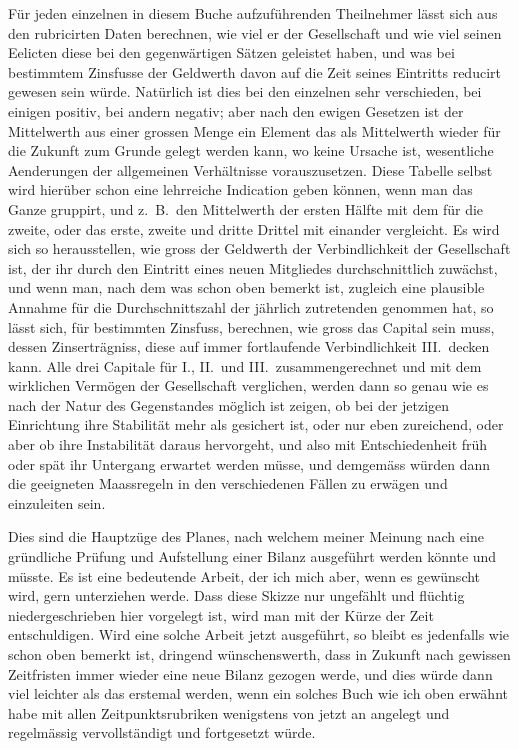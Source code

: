 \documentclass[12pt,a4paper]{article}
\begin{document}
F\"ur jeden einzelnen in diesem Buche aufzuf\"uhrenden Theilnehmer l\"asst sich aus den rubricirten Daten berechnen, wie viel er der Gesellschaft und wie viel seinen Eelicten diese bei den gegenw\"artigen S\"atzen geleistet haben, und was bei bestimmtem Zinsfusse der Geldwerth davon auf die Zeit seines Eintritts reducirt gewesen sein w\"urde. Nat\"urlich ist dies bei den einzelnen sehr verschieden, bei einigen positiv, bei andern negativ; aber nach den ewigen Gesetzen ist der Mittelwerth aus einer grossen Menge ein Element das als Mittelwerth wieder f\"ur die Zukunft zum Grunde gelegt werden kann, wo keine Ursache ist, wesentliche Aenderungen der allgemeinen Verh\"altnisse vorauszusetzen. Diese Tabelle selbst wird hier\"uber schon eine lehrreiche Indication geben k\"onnen, wenn man das Ganze gruppirt, und z.\ B.\ den Mittelwerth der ersten H\"alfte mit dem f\"ur die zweite, oder das erste, zweite und dritte Drittel mit einander vergleicht. Es wird sich so herausstellen, wie gross der Geldwerth der Verbindlichkeit der Gesellschaft ist, der ihr durch den Eintritt eines neuen Mitgliedes durchschnittlich zuw\"achst, und wenn man, nach dem was schon oben bemerkt ist, zugleich eine plausible Annahme f\"ur die Durchschnittszahl der j\"ahrlich zutretenden genommen hat, so l\"asst sich, f\"ur bestimmten Zinsfuss, berechnen, wie gross das Capital sein muss, dessen Zinsertr\"agniss, diese auf immer fortlaufende Verbindlichkeit III.\ decken kann. Alle drei Capitale f\"ur I., II.\ und III.\ zusammengerechnet und mit dem wirklichen Verm\"ogen der Gesellschaft verglichen, werden dann so genau wie es nach der Natur des Gegenstandes m\"oglich ist zeigen, ob bei der jetzigen Einrichtung ihre Stabilit\"at mehr als gesichert ist, oder nur eben zureichend, oder aber ob ihre Instabilit\"at daraus hervorgeht, und also mit Entschiedenheit fr\"uh oder sp\"at ihr Untergang erwartet werden m\"usse, und demgem\"ass w\"urden dann die geeigneten Maassregeln in den verschiedenen F\"allen zu erw\"agen und einzuleiten sein.

Dies sind die Hauptz\"uge des Planes, nach welchem meiner Meinung nach eine gr\"undliche Pr\"ufung und Aufstellung einer Bilanz ausgef\"uhrt werden k\"onnte und m\"usste. Es ist eine bedeutende Arbeit, der ich mich aber, wenn es gew\"unscht wird, gern unterziehen werde. Dass diese Skizze nur ungef\"ahlt und fl\"uchtig niedergeschrieben hier vorgelegt ist, wird man mit der K\"urze der Zeit entschuldigen. Wird eine solche Arbeit jetzt ausgef\"uhrt, so bleibt es jedenfalls wie schon oben bemerkt ist, dringend w\"unschenswerth, dass in Zukunft nach gewissen Zeitfristen immer wieder eine neue Bilanz gezogen werde, und dies w\"urde dann viel leichter als das erstemal werden, wenn ein solches Buch wie ich oben erw\"ahnt habe mit allen Zeitpunktsrubriken wenigstens von jetzt an angelegt und regelm\"assig vervollst\"andigt und fortgesetzt w\"urde.
\end{document}
